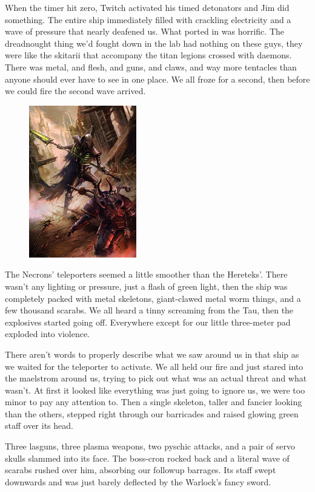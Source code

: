 When the timer hit zero, Twitch activated his timed detonators and Jim did something. 
The entire ship immediately filled with crackling electricity and a wave of pressure that nearly deafened us. 
What ported in was horrific. 
The dreadnought thing we'd fought down in the lab had nothing on these guys, they were like the skitarii that accompany the titan legions crossed with daemons. 
There was metal, and flesh, and guns, and claws, and way more tentacles than anyone should ever have to see in one place. 
We all froze for a second, then before we could fire the second wave arrived.

\begin{figure}
	\begin{center}
		\includegraphics[width=\figwidth]{pics/11/90.png}
	\end{center}
\end{figure}
The Necrons' teleporters seemed a little smoother than the Hereteks'. 
There wasn't any lighting or pressure, just a flash of green light, then the ship was completely packed with metal skeletons, giant-clawed metal worm things, and a few thousand scarabs. 
We all heard a tinny screaming from the Tau, then the explosives started going off. 
Everywhere except for our little three-meter pad exploded into violence.

There aren't words to properly describe what we saw around us in that ship as we waited for the teleporter to activate. 
We all held our fire and just stared into the maelstrom around us, trying to pick out what was an actual threat and what wasn't. 
At first it looked like everything was just going to ignore us, we were too minor to pay any attention to. 
Then a single skeleton, taller and fancier looking than the others, stepped right through our barricades and raised glowing green staff over its head. 


Three lasguns, three plasma weapons, two pyschic attacks, and a pair of servo skulls slammed into its face. 
The boss-cron rocked back and a literal wave of scarabs rushed over him, absorbing our followup barrages. 
Its staff swept downwards and was just barely deflected by the Warlock's fancy sword.


